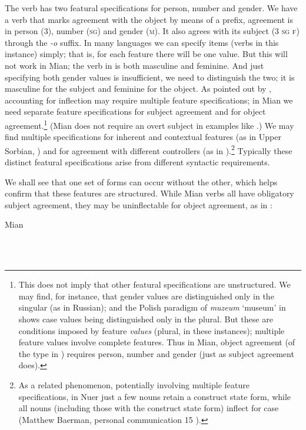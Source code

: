 \documentclass[output=paper]{langscibook}
\begin{document}
The verb has two featural specifications for person, number and gender. We have a verb that marks agreement with the object by means of a prefix, agreement is in person (\textsc{3}), number (\textsc{sg}) and gender (\textsc{m}). It also agrees with its subject (\textsc{3} \textsc{sg} \textsc{f}) through the \textit{{}-o} suffix. In many languages we can specify items (verbs in this instance) simply; that is, for each feature there will be one value. But this will not work in Mian; the verb in  is both masculine and feminine. And just specifying both gender values is insufficient, we need to distinguish the two; it is masculine for the subject and feminine for the object. As pointed out by \citet{Zwicky1986}, accounting for inflection may require multiple feature specifications; in Mian we need separate feature specifications for subject agreement and for object agreement.\footnote{This does not imply that other featural specifications are unstructured. We may find, for instance, that gender values are distinguished only in the singular (as in Russian); and the Polish paradigm of \textit{muzeum} ‘museum’ in  shows case values being distinguished only in the plural. But these are conditions imposed by feature \textit{values} (plural, in these instances); multiple feature values involve complete features. Thus in Mian, object agreement (of the type in ) requires person, number and gender (just as subject agreement does).} (Mian does not require an overt subject in examples like .) We may find multiple specifications for inherent and contextual features (as in Upper Sorbian, \citealt{Corbett1987}) and for agreement with different controllers (as in ).\footnote{ \textrm{As a related phenomenon, potentially involving multiple feature specifications, in Nuer just a few nouns retain a construct state form, while all nouns (including those with the construct state form) inflect for case (Matthew Baerman, personal communication 15 \citealt{June2023}).}} Typically these distinct featural specifications arise from different syntactic requirements. 

We shall see that one set of forms can occur without the other, which helps confirm that these features are structured. While Mian verbs all have obligatory subject agreement, they may be uninflectable for object agreement, as in :

Mian \citep[284]{Fedden2022}

\ea%
    \label{ex:key:10}
    \gll \\
         \\
    \glt
    \z %
\end{document}

